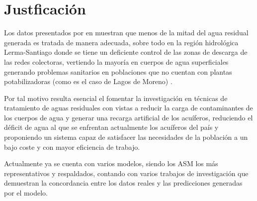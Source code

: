 \section{Justficación}
Los datos presentados por en \cite{ODS23} muestran que menos de la mitad del agua residual generada es tratada de manera adecuada, sobre todo en la región hidrológica Lerma-Santiago donde se tiene un deficiente control de las zonas de descarga de las redes colectoras, vertiendo la mayoría en cuerpos de agua superficiales generando problemas sanitarios en poblaciones que no cuentan con plantas potabilizadoras (como es el caso de Lagos de Moreno) \citep{CEAJ2015}.\par
Por tal motivo resulta esencial el fomentar la investigación en técnicas de tratamiento de aguas residuales con vistas a reducir la carga de contaminantes de los cuerpos de agua y generar una recarga artificial de los acuíferos, reduciendo el déficit de agua al que se enfrentan actualmente los acuíferos del país y proponiendo un sistema capaz de satisfacer las necesidades de la población a un bajo coste y con mayor eficiencia de trabajo.\par
Actualmente ya se cuenta con varios modelos, siendo los \gls{ASM} los más representativos y respaldados, contando con varios trabajos de investigación que demuestran la concordancia entre los datos reales y las predicciones generadas por el modelo.